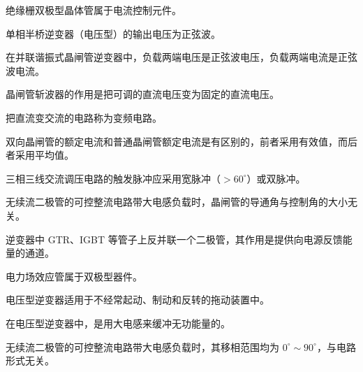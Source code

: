 \documentclass[电力电子]{subfiles}
\begin{document}
	\begin{ti}
		绝缘栅双极型晶体管属于电流控制元件。\cuo
	\end{ti}

	\begin{ti}
		单相半桥逆变器（电压型）的输出电压为正弦波。\cuo
	\end{ti}

	\begin{ti}
		在并联谐振式晶闸管逆变器中，负载两端电压是正弦波电压，负载两端电流是正弦波电流。\cuo
	\end{ti}

	\begin{ti}
		晶闸管斩波器的作用是把可调的直流电压变为固定的直流电压。\cuo
	\end{ti}

	\begin{ti}
		把直流变交流的电路称为变频电路。\cuo
	\end{ti}

	\begin{ti}
		双向晶闸管的额定电流和普通晶闸管额定电流是有区别的，前者采用有效值，而后者采用平均值。\dui
	\end{ti}

	\begin{ti}
		三相三线交流调压电路的触发脉冲应采用宽脉冲（$> 60^\circ$）或双脉冲。\dui
	\end{ti}

	\begin{ti}
		无续流二极管的可控整流电路带大电感负载时，晶闸管的导通角与控制角的大小无关。\dui
	\end{ti}

	\begin{ti}
		逆变器中 GTR、IGBT 等管子上反并联一个二极管，其作用是提供向电源反馈能量的通道。\dui
	\end{ti}

	\begin{ti}
		电力场效应管属于双极型器件。\cuo
	\end{ti}

	\begin{ti}
		电压型逆变器适用于不经常起动、制动和反转的拖动装置中。\dui
	\end{ti}

	\begin{ti}
		在电压型逆变器中，是用大电感来缓冲无功能量的。\cuo
	\end{ti}

	\begin{ti}
		无续流二极管的可控整流电路带大电感负载时，其移相范围均为 $0^\circ \sim 90^\circ$，与电路形式无关。\dui
	\end{ti}
\end{document}
